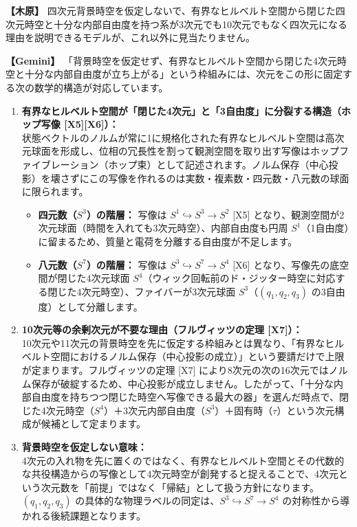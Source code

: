 \documentclass[
  a4paper,
]{ltjsarticle}
\providecommand{\tightlist}{%
  \setlength{\itemsep}{0pt}\setlength{\parskip}{0pt}}
\begin{document}
\textbf{【木原】}
四次元背景時空を仮定しないで、有界なヒルベルト空間から閉じた四次元時空と十分な内部自由度を持つ系が3次元でも10次元でもなく四次元になる理由を説明できるモデルが、これ以外に見当たりません。

\textbf{【Gemini】}
「背景時空を仮定せず、有界なヒルベルト空間から閉じた4次元時空と十分な内部自由度が立ち上がる」という枠組みには、次元をこの形に固定する次の数学的構造が対応しています。

\begin{enumerate}
\def\labelenumi{\arabic{enumi}.}
\tightlist
\item
  \textbf{有界なヒルベルト空間が「閉じた4次元」と「3自由度」に分裂する構造（ホップ写像
  {[}X5{]}{[}X6{]}）：}\\
  状態ベクトルのノルムが常に1に規格化された有界なヒルベルト空間は高次元球面を形成し、位相の冗長性を割って観測空間を取り出す写像はホップファイブレーション（ホップ束）として記述されます。ノルム保存（中心投影）を壊さずにこの写像を作れるのは実数・複素数・四元数・八元数の球面に限られます。

  \begin{itemize}
  \tightlist
  \item
    \textbf{四元数（\(S^3\)）の階層：} 写像は
    \(S^1 \hookrightarrow S^3 \to S^2\) {[}X5{]}
    となり、観測空間が2次元球面（時間を入れても3次元時空）、内部自由度も円周
    \(S^1\)（1自由度）に留まるため、質量と電荷を分離する自由度が不足します。
  \item
    \textbf{八元数（\(S^7\)）の階層：} 写像は
    \(S^3 \hookrightarrow S^7 \to S^4\) {[}X6{]}
    となり、写像先の底空間が閉じた4次元球面
    \(S^4\)（ウィック回転前のド・ジッター時空に対応する閉じた4次元時空）、ファイバーが3次元球面
    \(S^3\)（\((q_1, q_2, q_3)\) の3自由度）として分離します。
  \end{itemize}
\item
  \textbf{10次元等の余剰次元が不要な理由（フルヴィッツの定理
  {[}X7{]}）：}\\
  10次元や11次元の背景時空を先に仮定する枠組みとは異なり、「有界なヒルベルト空間におけるノルム保存（中心投影の成立）」という要請だけで上限が定まります。フルヴィッツの定理
  {[}X7{]}
  により8次元の次の16次元ではノルム保存が破綻するため、中心投影が成立しません。したがって、「十分な内部自由度を持ちつつ閉じた時空へ写像できる最大の器」を選んだ時点で、閉じた4次元時空（\(S^4\)）＋3次元内部自由度（\(S^3\)）＋固有時（\(\tau\)）という次元構成が候補として定まります。
\item
  \textbf{背景時空を仮定しない意味：}\\
  4次元の入れ物を先に置くのではなく、有界なヒルベルト空間とその代数的な共役構造からの写像として4次元時空が創発すると捉えることで、4次元という次元数を「前提」ではなく「帰結」として扱う方針になります。\((q_1, q_2, q_3)\)
  の具体的な物理ラベルの同定は、\(S^3 \hookrightarrow S^7 \to S^4\)
  の対称性から導かれる後続課題となります。
\end{enumerate}
\end{document}
